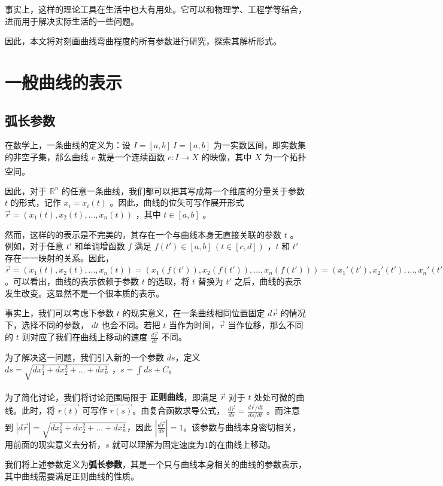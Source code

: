 \documentclass[fontset=windows]{article}
\newcommand{\upcite}[1]{\textsuperscript{\cite{#1}}}
\begin{document}
事实上，这样的理论工具在生活中也大有用处。它可以和物理学、工程学等结合，进而用于解决实际生活的一些问题。

因此，本文将对刻画曲线弯曲程度的所有参数进行研究，探索其解析形式。

\section{一般曲线的表示}

\subsection{弧长参数}

在数学上，一条曲线的定义为：设 ${\displaystyle I=[a,b]}\ I=[a,b]$ 为一实数区间，即实数集的非空子集，那么曲线 $c$ 就是一个连续函数 $c : I → X$ 的映像，其中 $X$ 为一个拓扑空间。\upcite{ref1}

因此，对于 $\mathbb{R}^n$ 的任意一条曲线，我们都可以把其写成每一个维度的分量关于参数 $t$ 的形式，记作 $x_i = x_i(t)$ 。因此，曲线的位矢可写作展开形式 $\vec{r} = (x_1(t),x_2(t),...,x_n(t))$ ，其中 $t \in [a,b]$ 。

然而，这样的的表示是不完美的，其存在一个与曲线本身无直接关联的参数 $t$ 。例如，对于任意 $t'$ 和单调增函数 $f$ 满足 $f(t') \in [a,b] \ (t\in[c,d])$ ，$t$ 和 $t'$ 存在一一映射的关系。因此， $\vec{r} = (x_1(t),x_2(t),...,x_n(t)) = (x_1(f(t')),x_2(f(t')),...,x_n(f(t'))) = (x_1'(t'),x_2'(t'),...,x_n'(t'))$。可以看出，曲线的表示依赖于参数 $t$ 的选取，将 $t$ 替换为 $t'$ 之后，曲线的表示发生改变。这显然不是一个很本质的表示。

事实上，我们可以考虑下参数 $t$ 的现实意义，在一条曲线相同位置固定 $d\vec{r}$ 的情况下，选择不同的参数， $dt$ 也会不同。若把 $t$ 当作为时间，$\vec{r}$ 当作位移，那么不同的 $t$ 则对应了我们在曲线上移动的速度  $\frac{d\vec{r}}{dt}$ 不同。

为了解决这一问题，我们引入新的一个参数 $ds$，定义 $ds = \sqrt{dx_1^2+dx_2^2+...+dx_n^2}$ ，$ s= \int{ds} + C $。

为了简化讨论，我们将讨论范围局限于 \textbf{正则曲线\upcite{ref2}}，即满足 $\vec{r}$ 对于 $t$ 处处可微的曲线。此时，将 $\vec{r(t)}$ 可写作 $\vec{r(s)}$。由复合函数求导公式， $\frac{d\vec{r}}{ds} = \frac{d\vec{r}/dt}{ds/dt}$ 。而注意到 $|d\vec{r}| = \sqrt{dx_1^2+dx_2^2+...+dx_n^2}$，因此 $|\frac{d\vec{r}}{ds}| = 1$。该参数与曲线本身密切相关，用前面的现实意义去分析，$s$ 就可以理解为固定速度为1的在曲线上移动。

我们将上述参数定义为\textbf{弧长参数}，其是一个只与曲线本身相关的曲线的参数表示，其中曲线需要满足正则曲线的性质。
\end{document}
